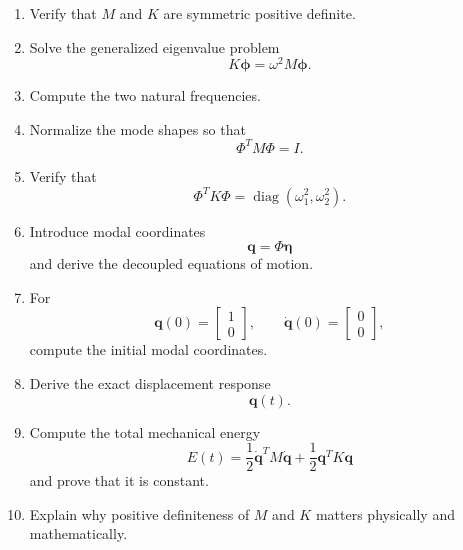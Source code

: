 \begin{enumerate}
    \item Verify that $M$ and $K$ are symmetric positive definite.

    \item Solve the generalized eigenvalue problem
    \begin{equation}
    K\boldsymbol{\phi}
    =
    \omega^2M\boldsymbol{\phi}.
    \end{equation}

    \item Compute the two natural frequencies.

    \item Normalize the mode shapes so that
    \begin{equation}
    \Phi^TM\Phi=I.
    \end{equation}

    \item Verify that
    \begin{equation}
    \Phi^TK\Phi
    =
    \operatorname{diag}
    \left(
    \omega_1^2,
    \omega_2^2
    \right).
    \end{equation}

    \item Introduce modal coordinates
    \begin{equation}
    \mathbf{q}=\Phi\boldsymbol{\eta}
    \end{equation}
    and derive the decoupled equations of motion.

    \item For
    \begin{equation}
    \mathbf{q}(0)=
    \begin{bmatrix}
    1\\
    0
    \end{bmatrix},
    \qquad
    \dot{\mathbf{q}}(0)=
    \begin{bmatrix}
    0\\
    0
    \end{bmatrix},
    \end{equation}
    compute the initial modal coordinates.

    \item Derive the exact displacement response
    \begin{equation}
    \mathbf{q}(t).
    \end{equation}

    \item Compute the total mechanical energy
    \begin{equation}
    E(t)
    =
    \frac{1}{2}
    \dot{\mathbf{q}}^TM\dot{\mathbf{q}}
    +
    \frac{1}{2}
    \mathbf{q}^TK\mathbf{q}
    \end{equation}
    and prove that it is constant.

    \item Explain why positive definiteness of $M$ and $K$ matters
    physically and mathematically.
\end{enumerate}


